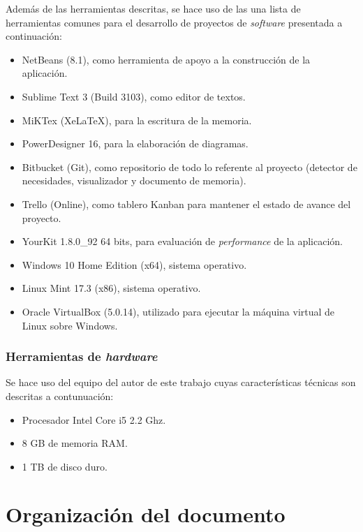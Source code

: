 Además de las herramientas descritas, se hace uso de las una lista de herramientas comunes para el desarrollo de proyectos de \textit{software} presentada a continuación:

\begin{itemize}
\item NetBeans (8.1), como herramienta de apoyo a la construcción de la aplicación.
\item Sublime Text 3 (Build 3103), como editor de textos.
\item MiKTex (XeLaTeX), para la escritura de la memoria.
\item PowerDesigner 16, para la elaboración de diagramas.
\item Bitbucket (Git), como repositorio de todo lo referente al proyecto (detector de necesidades, visualizador y documento de memoria).
\item Trello (Online), como tablero Kanban para mantener el estado de avance del proyecto.
\item YourKit 1.8.0\_92 64 bits, para evaluación de \textit{performance} de la aplicación.
\item Windows 10 Home Edition (x64), sistema operativo.
\item Linux Mint 17.3 (x86), sistema operativo.
\item Oracle VirtualBox (5.0.14), utilizado para ejecutar la máquina virtual de Linux sobre Windows.
\end{itemize}



\subsubsection*{Herramientas de \textit{hardware}}
\label{subsubsec:HerrHardw}

Se hace uso del equipo del autor de este trabajo cuyas características técnicas son descritas a contunuación:
\begin{itemize}
\item Procesador Intel Core i5 2.2 Ghz.
\item 8 GB de memoria RAM.
\item 1 TB de disco duro.
\end{itemize}

\section{Organización del documento}
\label{intro:organizacion}

